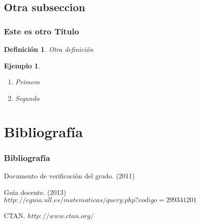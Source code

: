 \documentclass{beamer}
\newtheorem{definicion}{Definición}
\newtheorem{ejemplo}{Ejemplo}
\begin{document}
\subsection{Otra subseccion}
\begin{frame}
\frametitle{Este es otro Título}

\begin{definicion}
  Otra definición 
\end{definicion}

\begin{ejemplo}
  \begin{enumerate}
    \item
      Primero
      \pause

    \item
      Segundo 

  \end{enumerate}
\end{ejemplo}

\end{frame}

\section{Bibliografía}
\begin{frame}
  \frametitle{Bibliografía}

  \begin{thebibliography}{10}

    \beamertemplatebookbibitems
    Documento de verificación del grado. 
    (2011) 

    \beamertemplatebookbibitems
    Guía docente. 
    (2013) 
    {\small $http://eguia.ull.es/matematicas/query.php?codigo=299341201$}

    \beamertemplatebookbibitems
    CTAN. {\small $http://www.ctan.org/$}

  \end{thebibliography}
\end{frame}

\end{document}
